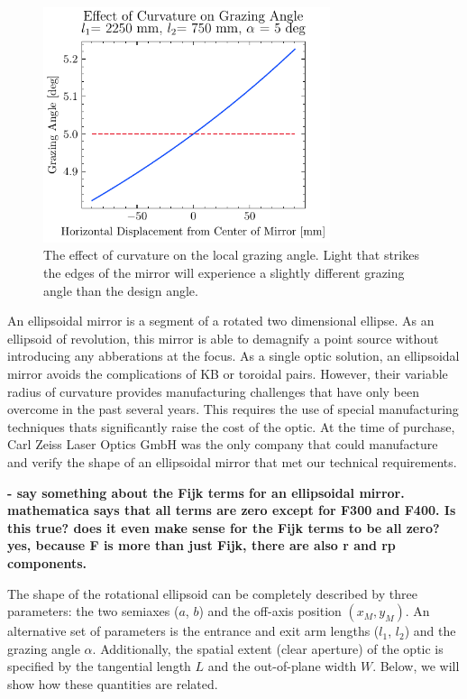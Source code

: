 \begin{figure}
	\centering
	\includegraphics[width=0.75\textwidth]{figures/chap2/EM_angle.pdf}
	\caption{The effect of curvature on the local grazing angle. Light that strikes the edges of the mirror will experience a slightly different grazing angle than the design angle.}
	\label{fig:EM_angle}
\end{figure}

An ellipsoidal mirror is a segment of a rotated two dimensional ellipse. As an ellipsoid of revolution, this mirror is able to demagnify a point source without introducing any abberations at the focus. As a single optic solution, an ellipsoidal mirror avoids the complications of KB or toroidal pairs. However, their variable radius of curvature provides manufacturing challenges that have only been overcome in the past several years. This requires the use of special manufacturing techniques thats significantly raise the cost of the optic. At the time of purchase, Carl Zeiss Laser Optics GmbH was the only company that could manufacture and verify the shape of an ellipsoidal mirror that met our technical requirements.


\textbf{- say something about the Fijk terms for an ellipsoidal mirror. mathematica says that all terms are zero except for F300 and F400. Is this true? does it even make sense for the Fijk terms to be all zero? yes, because F is more than just Fijk, there are also r and rp components.}



The shape of the rotational ellipsoid can be completely described by three parameters: the two semiaxes ($a$, $b$) and the off-axis position $(x_M, y_M)$. An alternative set of parameters is the entrance and exit arm lengths ($l_1$, $l_2$) and the grazing angle $\alpha$. Additionally, the spatial extent (clear aperture) of the optic is specified by the tangential length $L$ and the out-of-plane width $W$. Below, we will show how these quantities are related.

